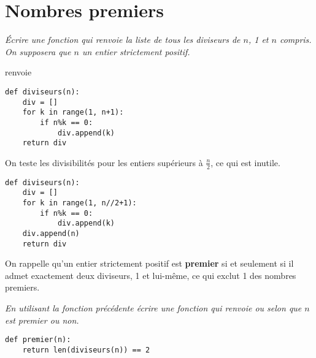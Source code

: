 \section{Nombres premiers} 
\begin{Exercise}[title = Diviseurs]
\it Écrire une fonction  qui renvoie la liste de tous les diviseurs de $n$, 1 et $n$ compris. On supposera que $n$ un entier strictement positif.

 renvoie \type{1, 2, 3, 5, 6, 10, 15, 30]}
\end{Exercise}
\begin{Answer}
\begin{lstlisting}
def diviseurs(n):
    div = []
    for k in range(1, n+1):
        if n%k == 0:
            div.append(k)
    return div
\end{lstlisting}

On teste les divisibilités pour les entiers supérieurs à $\frac n2$, ce qui est inutile.

\begin{lstlisting}
def diviseurs(n):
    div = []
    for k in range(1, n//2+1):
        if n%k == 0:
            div.append(k)
    div.append(n)
    return div
\end{lstlisting}

\end{Answer}
On rappelle qu'un entier strictement positif est {\bf premier} si et seulement si il admet exactement deux diviseurs, 1 et lui-même, ce qui exclut 1 des nombres premiers.
\begin{Exercise}[title = Test de primalité 1]
\it En utilisant la fonction précédente écrire une fonction  qui renvoie  ou  selon que $n$ est premier ou non.
\end{Exercise}
\begin{Answer}
\begin{lstlisting}
def premier(n):
    return len(diviseurs(n)) == 2
\end{lstlisting}
\end{Answer}
